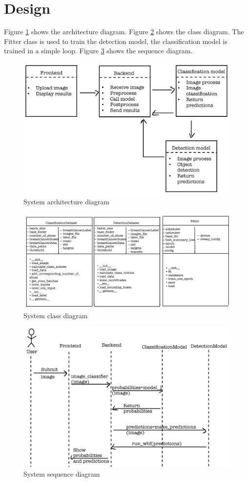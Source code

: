 \section{Design}

Figure \ref{fig:fig38} shows the architecture diagram. Figure \ref{fig:fig39} shows the class diagram. The Fitter class is used to train the detection model, the classification model is trained in a simple loop. Figure \ref{fig:fig40} shows the sequence diagram.

\begin{figure}[H]
    \centering
    \includegraphics[width=0.5\linewidth]{figures/Figure50.png}
    \caption{System architecture diagram}
    \label{fig:fig38}
\end{figure}

\begin{figure}[H]
    \centering
    \includegraphics[width=0.5\linewidth]{figures/Figure51.png}
    \caption{System class diagram}
    \label{fig:fig39}
\end{figure}

\begin{figure}[H]
    \centering
    \includegraphics[width=0.5\linewidth]{figures/Figure52.png}
    \caption{System sequence diagram}
    \label{fig:fig40}
\end{figure}

